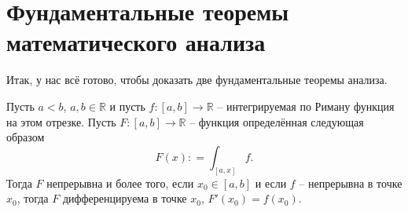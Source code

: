 \section{Фундаментальные теоремы математического анализа}

Итак, у нас всё готово, чтобы доказать две фундаментальные теоремы анализа.

\begin{theorem}
    Пусть $a<b$, $a,b\in \mathbb{R}$ и пусть $f:[a,b] \to \mathbb{R}$ -- интегрируемая по Риману функция на этом отрезке. Пусть $F:[a,b] \to \mathbb{R}$ -- функция определённая следующая образом
    \[
     F(x): = \int_{[a,x]}f.
    \]
    Тогда $F$ непрерывна и более того, если $x_0 \in [a,b]$ и если $f$ -- непрерывна в точке $x_0$, тогда $F$ дифференцируема в точке $x_0$, $F'(x_0) = f(x_0).$
\end{theorem}

